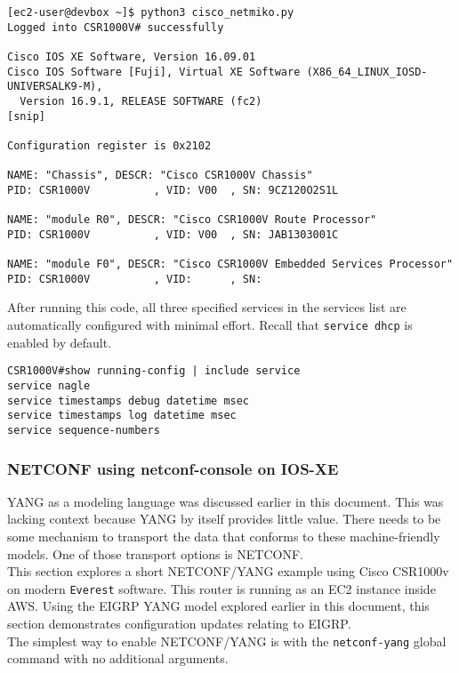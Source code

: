 \begin{verbatim}
[ec2-user@devbox ~]$ python3 cisco_netmiko.py
Logged into CSR1000V# successfully

Cisco IOS XE Software, Version 16.09.01
Cisco IOS Software [Fuji], Virtual XE Software (X86_64_LINUX_IOSD-UNIVERSALK9-M),
  Version 16.9.1, RELEASE SOFTWARE (fc2)
[snip]

Configuration register is 0x2102

NAME: "Chassis", DESCR: "Cisco CSR1000V Chassis"
PID: CSR1000V          , VID: V00  , SN: 9CZ120O2S1L

NAME: "module R0", DESCR: "Cisco CSR1000V Route Processor"
PID: CSR1000V          , VID: V00  , SN: JAB1303001C

NAME: "module F0", DESCR: "Cisco CSR1000V Embedded Services Processor"
PID: CSR1000V          , VID:      , SN:
\end{verbatim}

After running this code, all three specified services in the services list are
automatically configured with minimal effort. Recall that \verb|service dhcp|
is enabled by default.

\begin{verbatim}
CSR1000V#show running-config | include service
service nagle
service timestamps debug datetime msec
service timestamps log datetime msec
service sequence-numbers
\end{verbatim}

\subsubsection{NETCONF using netconf-console on IOS-XE}
YANG as a modeling language was discussed earlier in this document. This was
lacking context because YANG by itself provides little value. There needs to
be some mechanism to transport the data that conforms to these
machine-friendly models. One of those transport options is NETCONF\@. \\

This section explores a short NETCONF/YANG example using Cisco CSR1000v on
modern \verb|Everest| software. This router is running as an EC2 instance inside
AWS\@. Using the EIGRP YANG model explored earlier in this document, this
section demonstrates configuration updates relating to EIGRP\@. \\

The simplest way to enable NETCONF/YANG is with the \verb|netconf-yang| global
command with no additional arguments.

